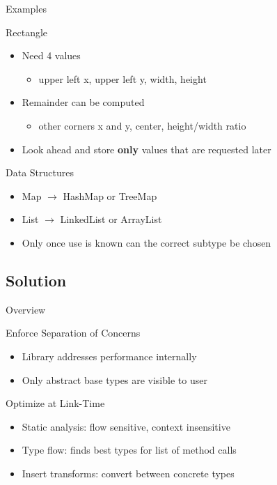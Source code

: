 \documentclass{beamer}
\begin{document}
\begin{frame}{Examples}
  \begin{block}{Rectangle}
    \begin{itemize}
    \item Need 4 values
      \begin{itemize}
      \item upper left x, upper left y, width, height
      \end{itemize}
    \item Remainder can be computed
      \begin{itemize}
      \item other corners x and y, center, height/width ratio
      \end{itemize}
\pause
    \item Look ahead and store {\bf only} values that are requested later
    \end{itemize}
  \end{block}
\pause
  \begin{block}{Data Structures}
    \begin{itemize}
    \item Map $\rightarrow$ HashMap or TreeMap
    \item List $\rightarrow$ LinkedList or ArrayList
    \item Only once use is known can the correct subtype be chosen
    \end{itemize}
  \end{block}
\end{frame}

\subsection{Solution}

\begin{frame}{Overview}
  \begin{block}{Enforce Separation of Concerns}
    \begin{itemize}
    \item Library addresses performance internally
    \item Only abstract base types are visible to user
    \end{itemize}
  \end{block}
\pause
  \begin{block}{Optimize at Link-Time}
    \begin{itemize}
    \item Static analysis: flow sensitive, context insensitive
    \item Type flow: finds best types for list of method calls
    \item Insert transforms: convert between concrete types
    \end{itemize}
  \end{block}
\end{frame}
\end{document}
